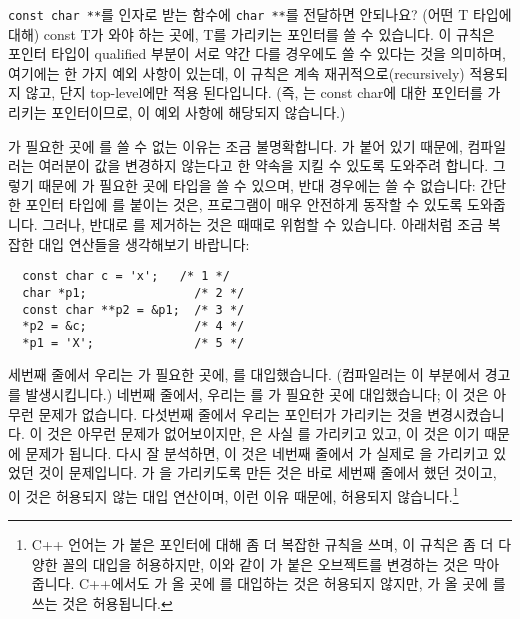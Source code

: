 \begin{faq}
	\verb+const char **+를 인자로 받는 함수에 \verb+char **+를
	전달하면 안되나요?
\A	
	(어떤 T 타입에 대해) const T가 와야 하는 곳에, T를 가리키는 포인터를
	쓸 수 있습니다.  이 규칙은 포인터 타입이 qualified 부분이 서로 약간
        다를 경우에도 쓸 수 있다는 것을 의미하며,
        여기에는 한 가지 예외 사항이 있는데, 이 규칙은
        계속 재귀적으로(recursively) 적용되지 않고,
        단지 top-level에만 적용 된다입니다.
        (즉, 는 const char에
        대한 포인터를 가리키는 포인터이므로, 이 예외 사항에 해당되지 않습니다.)

        가 필요한 곳에 를 쓸 수 없는 이유는
        조금 불명확합니다. 가 붙어 있기 때문에, 컴파일러는
        여러분이  값을 변경하지 않는다고 한 약속을 지킬 수 있도록
        도와주려 합니다. 그렇기 때문에 가 필요한 곳에
         타입을 쓸 수 있으며, 반대 경우에는 쓸 수 없습니다:
        간단한 포인터 타입에 를 붙이는 것은, 프로그램이
        매우 안전하게 동작할 수 있도록 도와줍니다. 그러나, 반대로 를
        제거하는 것은 때때로 위험할 수 있습니다. 아래처럼 조금 복잡한
        대입 연산들을 생각해보기 바랍니다:
\begin{verbatim}
  const char c = 'x';	/* 1 */
  char *p1;               /* 2 */
  const char **p2 = &p1;  /* 3 */
  *p2 = &c;               /* 4 */
  *p1 = 'X';              /* 5 */
\end{verbatim}
	세번째 줄에서 우리는 가 필요한 곳에, 를
        대입했습니다. (컴파일러는 이 부분에서 경고를 발생시킵니다.) 네번째
        줄에서, 우리는 를 가 필요한 곳에
        대입했습니다; 이 것은 아무런 문제가 없습니다. 다섯번째 줄에서 우리는
         포인터가 가리키는 것을 변경시켰습니다.  이 것은 아무런
        문제가 없어보이지만, 은 사실 를 가리키고 있고, 이 것은
        이기 때문에 문제가 됩니다. 다시 잘 분석하면, 이 것은 네번째
        줄에서 가 실제로 을 가리키고 있었던 것이 문제입니다.
        가 을 가리키도록 만든 것은 바로 세번째 줄에서 했던
        것이고, 이 것은 허용되지 않는 대입 연산이며, 이런 이유 때문에,
        허용되지 않습니다.\footnote{C++ 언어는 가 붙은 포인터에
          대해 좀 더 복잡한 규칙을 쓰며, 이 규칙은 좀 더 다양한 꼴의 대입을
          허용하지만, 이와 같이 가 붙은 오브젝트를 변경하는 것은
          막아 줍니다. C++에서도 가 올 곳에 를
          대입하는 것은 허용되지 않지만, 가
          올 곳에 를 쓰는 것은 허용됩니다.}


\end{faq}
